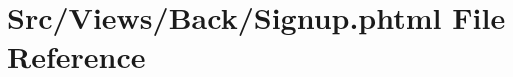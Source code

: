 \hypertarget{_signup_8phtml}{}\section{Src/\+Views/\+Back/\+Signup.phtml File Reference}
\label{_signup_8phtml}
